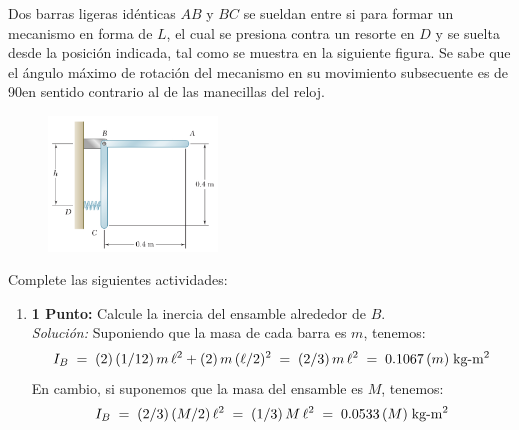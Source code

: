 \documentclass[ a4paper, twoside, 11pt]{article}
\begin{document}
\begin{problem}
Dos barras ligeras id\'enticas $AB$ y $BC$ se sueldan entre si para formar un mecanismo en forma de $L$, el cual se presiona contra un resorte en $D$ y se suelta desde la posici\'on indicada, tal como se muestra en la siguiente figura. Se sabe que el \'angulo m\'aximo de rotaci\'on del mecanismo en su movimiento subsecuente es de 90\deg en sentido contrario al de las manecillas del reloj. 

\begin{figure}[H]
\centering
\includegraphics[width=0.4\textwidth]{problema-04.jpg}
\end{figure}

Complete las siguientes actividades: 
\begin{enumerate}[label=\textbf{\alph*)}]
\item \textbf{1 Punto:} Calcule la inercia del ensamble alrededor de $B$. \\[1ex] \emph{Soluci\'on:} Suponiendo que la masa de cada barra es $m$, tenemos: 
\[
I_B \; = \; 
(2) \, (1/12) \, m \, \ell^2 + (2) \, m \, (\ell/2)^2
\; = \; (2/3) \, m \, \ell^2
\; = \; 0.1067 \, (m) \; \text{kg-m\ensuremath{^{\text{2}}}}
\]
En cambio, si suponemos que la masa del ensamble es $M$, tenemos: 
\[
I_B \; = \; (2/3) \, (M/2) \, \ell^2
\; = \; (1/3) \, M \, \ell^2
\; = \; 0.0533 \, (M) \; \text{kg-m\ensuremath{^{\text{2}}}}
\]


\end{enumerate}
\end{problem}
\end{document}
